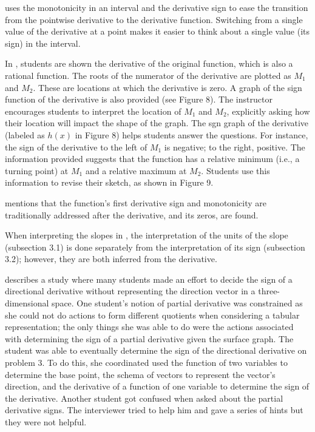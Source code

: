 \documentclass[11pt]{book}
\begin{document}
\cite{park2012transition} uses the monotonicity in an interval and
the derivative sign to ease the transition from the pointwise derivative
to the derivative function. Switching from a single
value of the derivative at a point makes it easier to think about
a single value (its sign) in the interval.

In \cite{criscuolo2013study}, students are shown the derivative of
the original function, which is also a rational function.
The roots of the numerator of the derivative are plotted as $M_{1}$
and $M_{2}$. These are locations at which the derivative is zero.
A graph of the sign function of the derivative is also provided (see Figure 8). The instructor encourages
students to interpret the location of $M_{1}$ and $M_{2}$, explicitly
asking how their location will impact the shape of the graph. The
sgn graph of the derivative (labeled as $h\left(x\right)$ in Figure
8) helps students answer the questions. For instance, the sign of
the derivative to the left of $M_{1}$ is negative; to the right,
positive. The information provided suggests that the function has a relative minimum (i.e.,
a \textquotedbl turning point\textquotedbl ) at $M_{1}$ and a relative maximum at $M_{2}$. Students use
this information to revise their sketch, as shown in Figure
9.

\cite{kostic2014extreme} mentions that the function's first derivative
sign and monotonicity are traditionally addressed after the derivative,
and its zeros, are found.

When interpreting the slopes in \cite{sokolowski2014constructivist},
the interpretation of the units of the slope (subsection 3.1) is
done separately from the interpretation of its sign (subsection
3.2); however, they are both inferred from the derivative.

\cite{martinez2015students} describes a study where many students made an effort
to decide the sign of a directional derivative without representing
the direction vector in a three-dimensional space. One student's
notion of partial derivative was constrained as she could not do actions
to form different quotients when considering a tabular representation; the only things she was able to do were the actions
associated with determining the sign of a partial derivative given
the surface graph. The student was able to eventually determine the sign
of the directional derivative on problem 3. To do this,
she coordinated used the function of two variables to determine the
base point, the schema of vectors to represent the vector's direction,
and the derivative of a function of one variable to determine the
sign of the derivative. Another student got confused when
asked about the partial derivative signs. The interviewer tried to
help him and gave a series of hints but they were not helpful.
\end{document}
